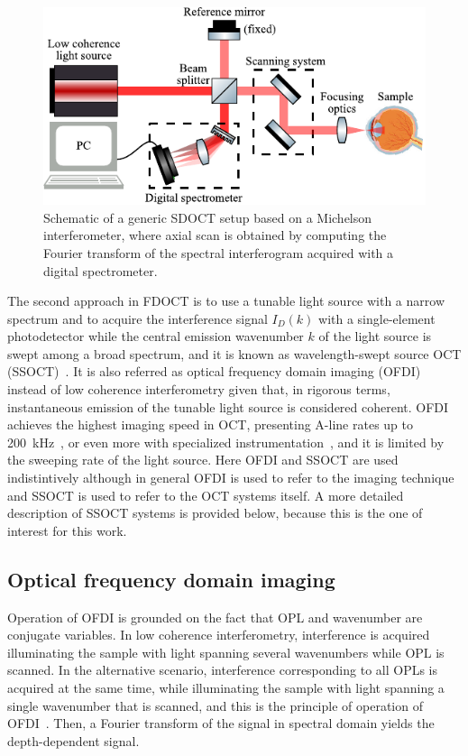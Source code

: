 \begin{figure}
    \centering
    \includegraphics[width=.75\textwidth]{Figures/TheoreticalBasis/SDOCT_Scheme.pdf}
    \caption{Schematic of a generic SDOCT setup based on a Michelson interferometer, where axial scan is obtained by computing the Fourier transform of the spectral interferogram acquired with a digital spectrometer.}
    \label{fig:SDOCT_Scheme}
\end{figure}

The second approach in FDOCT is to use a tunable light source with a narrow spectrum and to acquire the interference signal $I_D(k)$ with a single-element photodetector while the central emission wavenumber $k$ of the light source is swept among a broad spectrum, and it is known as wavelength-swept source OCT (SSOCT)~\cite{Chinn1997_Optical, Yun2003_Highspeed}. It is also referred as optical frequency domain imaging (OFDI)~\cite{Bouma2015_Optical} instead of low coherence interferometry given that, in rigorous terms, instantaneous emission of the tunable light source is considered coherent. OFDI achieves the highest imaging speed in OCT, presenting A-line rates up to 200~kHz~\cite{Okabe2012_200}, or even more with specialized instrumentation~\cite{Oh2010_400}, and it is limited by the sweeping rate of the light source. Here OFDI and SSOCT are used indistintively although in general OFDI is used to refer to the imaging technique and SSOCT is used to refer to the OCT systems itself. A more detailed description of SSOCT systems is provided below, because this is the one of interest for this work.

\subsection{Optical frequency domain imaging}

Operation of OFDI is grounded on the fact that OPL and wavenumber are conjugate variables. In low coherence interferometry, interference is acquired illuminating the sample with light spanning several wavenumbers while OPL is scanned. In the alternative scenario, interference corresponding to all OPLs is acquired  at the same time, while illuminating the sample with light spanning a single wavenumber that is scanned, and this is the principle of operation of OFDI~\cite{Yun2003_Highspeed}. Then, a Fourier transform of the signal in spectral domain yields the depth-dependent signal.

